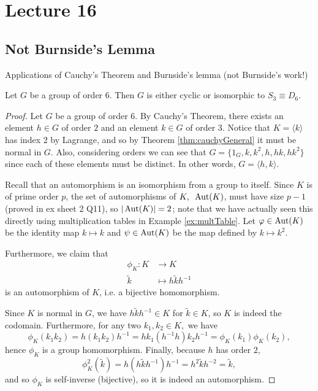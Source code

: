 \section{Lecture 16}
\subsection{Not Burnside's Lemma}
Applications of Cauchy's Theorem and Burnside's lemma (not Burnside's work!)
\begin{example} 
  Let $G$ be a group of order $6$. Then $G$ is either cyclic or isomorphic to $S_3\equiv
  D_{6}$.
\end{example}
\begin{proof}
  Let $G$ be a group of order 6. By Cauchy's Theorem, there exists an element $h\in G$ of order $2$ and an
  element $k\in G$ of order $3$. Notice that $K=\langle k \rangle$ has index $2$ by
  Lagrange, and so by Theorem \ref{thm:cauchyGeneral} it must be normal in $G$. 
  Also, considering orders we can see that $G = \{1_G, k, k^2, h, hk, hk^2 \}$ since each of these elements must be distinct. In other words, $G = \langle h, k \rangle.$
  
  
  Recall that an automorphism is an isomorphism from a group to itself. Since $K$ is of prime order $p$, the set of automorphisms of $K,\text{ } \operatorname{Aut}(K)$, must have size $p-1$ (proved in ex sheet 2 Q11), so $|\operatorname{Aut}(K)|=2$;
  note that we have actually seen this directly using multiplication tables in Example \ref{ex:multTable}. Let $\varphi \in \operatorname{Aut}(K)$ be the identity map $k \mapsto k$ and $\psi \in \operatorname{Aut}(K)$ be the map defined by $k \mapsto k^2.$
  

  Furthermore, we claim that 
  \begin{align*}
      \phi_K: K &\to K \\
      \tilde{k} &\mapsto h \tilde{k} h^{-1}
  \end{align*}
  is an automorphism of $K$, i.e. a bijective homomorphism. 

  Since $K$ is normal in $G$, we have $h\tilde{k}h^{-1}\in K$ for $\tilde{k} \in K$, so $K$ is indeed the codomain. Furthermore, for any two $k_1,k_2\in K,$ we have
  $$\phi_K(k_1k_2)=h(k_1k_2)h^{-1} = 
  hk_1(h^{-1}h)k_2h^{-1} = \phi_K(k_1)\phi_K(k_2),$$ hence $\phi_K$ is a group homomorphism.
  Finally, because $h$ has order $2$,
  $$\phi_K^2(\tilde{k}) = h(h\tilde{k}h^{-1})h^{-1}= h^2 \tilde{k} h^{-2} = \tilde{k},$$ and so $\phi_K$ is self-inverse (bijective), so it is indeed an automorphism.


\end{proof}
